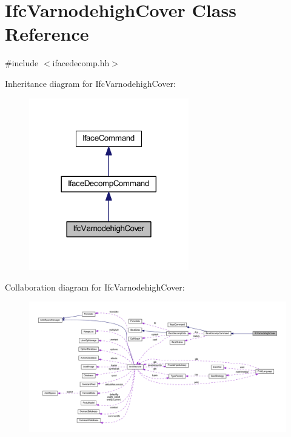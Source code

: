 \hypertarget{class_ifc_varnodehigh_cover}{}\section{Ifc\+Varnodehigh\+Cover Class Reference}
\label{class_ifc_varnodehigh_cover}


{\ttfamily \#include $<$ifacedecomp.\+hh$>$}



Inheritance diagram for Ifc\+Varnodehigh\+Cover\+:
\nopagebreak
\begin{figure}[H]
\begin{center}
\leavevmode
\includegraphics[width=197pt]{class_ifc_varnodehigh_cover__inherit__graph}
\end{center}
\end{figure}


Collaboration diagram for Ifc\+Varnodehigh\+Cover\+:
\nopagebreak
\begin{figure}[H]
\begin{center}
\leavevmode
\includegraphics[width=350pt]{class_ifc_varnodehigh_cover__coll__graph}
\end{center}
\end{figure}

